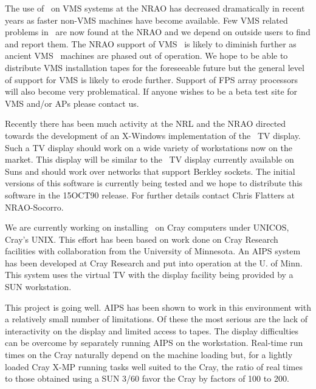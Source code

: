 \eject


     The use of \AIPS\ on VMS systems at the NRAO has decreased
dramatically in recent years as faster non-VMS machines have become
available.  Few VMS related problems in \AIPS\ are
now found at the NRAO and we depend on outside users to find
and report them.  The NRAO support of VMS \AIPS\ is likely to diminish
further as ancient VMS \AIPS\ machines
are phased out of operation.  We hope to be able to distribute VMS
installation tapes for the foreseeable future but the general level of
support for VMS is likely to erode further.  Support of FPS array
processors will also become very problematical.  If anyone wishes to
be a beta test site for VMS and/or APs please contact us.


     Recently there has been much activity at the NRL and the NRAO
directed towards the development of an X-Windows implementation of the
\AIPS\ TV display.  Such a TV display should work on a wide variety of
workstations now on the market.  This display will be similar to the
\AIPS\ TV display currently available on Suns and should work over
networks that support Berkley sockets.  The initial versions of this
software is currently being tested and we hope to distribute this
software in the 15OCT90 release.  For further details contact Chris
Flatters at NRAO-Socorro.


   We are currently working on installing \AIPS\ on Cray computers
under UNICOS, Cray's UNIX.  This effort has been based on work done on
Cray Research facilities with collaboration from the University of
Minnesota.  An AIPS system has been developed at Cray Research and put
into operation at the U. of Minn.  This system uses the virtual TV
with the display facility being provided by a SUN workstation.

This project is going well.  AIPS has been shown to work in this
environment with a relatively small number of limitations.  Of these
the most serious are the lack of interactivity on the display and
limited access to tapes.  The display difficulties can be overcome by
separately running AIPS on the workstation.  Real-time run times on
the Cray naturally depend on the machine loading but, for a lightly
loaded Cray X-MP running tasks well suited to the Cray, the ratio of
real times to those obtained using a SUN 3/60 favor the Cray by
factors of 100 to 200.

